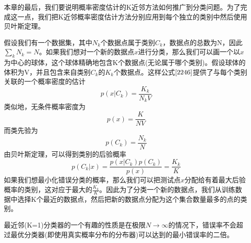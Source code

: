 本章的最后，我们要说明概率密度估计的K近邻方法如何推广到分类问题。为了完成这一点，我们把K近邻概率密度估计方法分别应用到每个独立的类别中然后使用贝叶斯定理。

假设我们有一个数据集，其中$N_k$个数据点属于类别$C_k$，数据点的总数为N，因此$\sum_k N_k=N$。如果我们想对一个新的数据点$x$进行分类，那么我们可以画一个以$x$为中心的球体，这个球体精确地包含K个数据点(无论属于哪个类别)。假设球体的体积为V，并且包含来自类别$C_k$的$K_k$个数据点。这样公式$\ref{2246}$提供了与每个类别关联的一个概率密度的估计 
\begin{equation}
	p(x|C_k)=\frac{K_k}{N_kV}
\end{equation}
类似地，无条件概率密度为
\begin{equation}
	p(x)=\frac{K}{NV}
\end{equation}
而类先验为
\begin{equation}
	p(C_k)=\frac{N_k}{N}
\end{equation}
由贝叶斯定理，可以得到类别的后验概率 
\begin{equation}
	p(C_k|x)=\frac{p(x|C_k)p(C_k)}{p(x)}=\frac{K_k}{K}
\end{equation}
如果我们想最小化错误分类的概率，那么我们可以把测试点$x$分配给有着最大后验概率的类别，这对应于最大的$\frac{K_k}{K}$。因此为了分类一个新的数据点，我们从训练数据中选择K个最近的数据点，然后把新的数据点分配为这个集合数量最多的点的类别。

最近邻(K=1)分类器的一个有趣的性质是在极限$N\to \infty$的情况下，错误率不会超过最优分类器(即使用真实概率分布的分布器)可以达到的最小错误率的二倍。